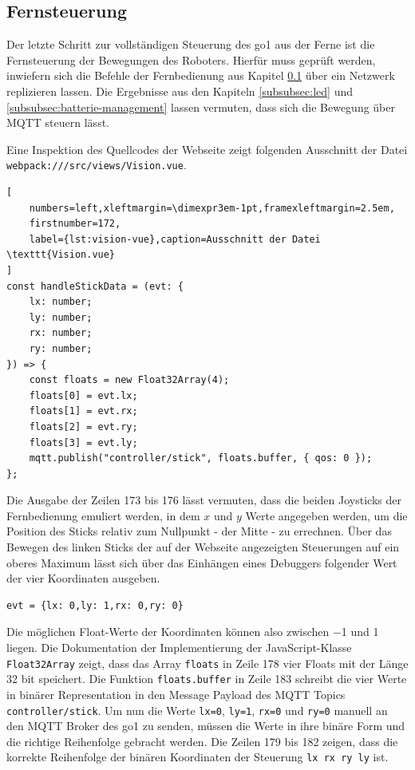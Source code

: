 \subsection{Fernsteuerung}
\label{subsec:fernsteuerung}

Der letzte Schritt zur vollständigen Steuerung des \gls{go1} aus der Ferne ist die Fernsteuerung der Bewegungen des
Roboters.
Hierfür muss geprüft werden, inwiefern sich die Befehle der Fernbedienung aus Kapitel \ref{subsec:fernsteuerung}
über ein Netzwerk replizieren lassen.
Die Ergebnisse aus den Kapiteln \ref{subsubsec:led} und \ref{subsubsec:batterie-management} lassen vermuten, dass sich
die Bewegung über MQTT steuern lässt.


Eine Inspektion des Quellcodes der Webseite zeigt folgenden Ausschnitt der Datei \texttt{webpack\allowbreak :///\allowbreak src/\allowbreak views/\allowbreak Vision.vue}.

\begin{lstlisting}[
    numbers=left,xleftmargin=\dimexpr3em-1pt,framexleftmargin=2.5em,
    firstnumber=172,
    label={lst:vision-vue},caption=Ausschnitt der Datei \texttt{Vision.vue}
]
const handleStickData = (evt: {
    lx: number;
    ly: number;
    rx: number;
    ry: number;
}) => {
    const floats = new Float32Array(4);
    floats[0] = evt.lx;
    floats[1] = evt.rx;
    floats[2] = evt.ry;
    floats[3] = evt.ly;
    mqtt.publish("controller/stick", floats.buffer, { qos: 0 });
};
\end{lstlisting}

Die Ausgabe der Zeilen \num{173} bis \num{176} lässt vermuten, dass die beiden Joysticks der Fernbedienung emuliert werden,
in dem $x$ und $y$ Werte angegeben werden, um die Position des Sticks relativ zum Nullpunkt - der Mitte - zu errechnen.
Über das Bewegen des linken Sticks der auf der Webseite angezeigten Steuerungen auf ein oberes Maximum lässt sich über
das Einhängen eines Debuggers folgender Wert der vier Koordinaten ausgeben.

\begin{lstlisting}
evt = {lx: 0,ly: 1,rx: 0,ry: 0}
\end{lstlisting}

\noindent Die möglichen Float-Werte der Koordinaten können also zwischen \num{-1} und \num{1} liegen.
Die Dokumentation der Implementierung der JavaScript-Klasse \texttt{Float32Array} zeigt, dass das Array \texttt{floats}
in Zeile \num{178} vier Floats mit der Länge \num{32} bit speichert.
Die Funktion \texttt{floats.buffer} in Zeile \num{183} schreibt die vier Werte in binärer Representation in den Message
Payload des MQTT Topics \texttt{controller/stick}.
Um nun die Werte \texttt{lx=0}, \texttt{ly=1}, \texttt{rx=0} und \texttt{ry=0} manuell an den MQTT Broker des \gls{go1} zu
senden, müssen die Werte in ihre binäre Form und die richtige Reihenfolge gebracht werden.
Die Zeilen \num{179} bis \num{182} zeigen, dass die korrekte Reihenfolge der binären Koordinaten der Steuerung
\texttt{lx \textrightarrow rx \textrightarrow ry \textrightarrow ly} ist.

